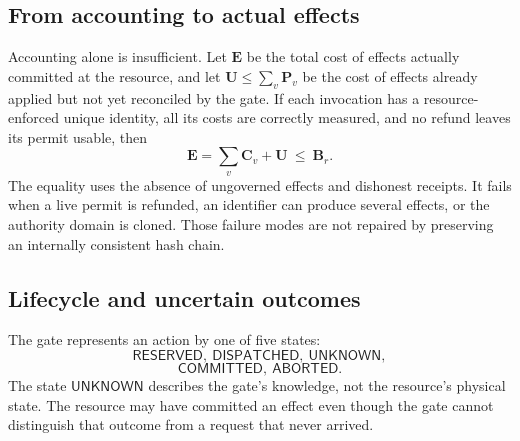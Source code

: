 \documentclass[10pt,journal,a4paper]{IEEEtran}
\newcommand{\state}[1]{\ensuremath{\mathsf{#1}}}
\newcommand{\Budget}{\mathbf{B}}
\newcommand{\Pending}{\mathbf{P}}
\newcommand{\Spent}{\mathbf{C}}
\begin{document}
\subsection{From accounting to actual effects}
Accounting alone is insufficient. Let $\mathbf E$ be the total cost of effects actually committed at the resource, and let $\mathbf U\leq\sum_v\Pending_v$ be the cost of effects already applied but not yet reconciled by the gate. If each invocation has a resource-enforced unique identity, all its costs are correctly measured, and no refund leaves its permit usable, then
\begin{equation}
\mathbf E=\sum_v\Spent_v+\mathbf U
\ \leq\ \Budget_r .
\label{eq:effects}
\end{equation}
The equality uses the absence of ungoverned effects and dishonest receipts. It fails when a live permit is refunded, an identifier can produce several effects, or the authority domain is cloned. Those failure modes are not repaired by preserving an internally consistent hash chain.

\subsection{Lifecycle and uncertain outcomes}
The gate represents an action by one of five states:
\begin{equation*}
\state{RESERVED},\ \state{DISPATCHED},\ \state{UNKNOWN},
\end{equation*}
\begin{equation*}
\state{COMMITTED},\ \state{ABORTED}.
\end{equation*}
The state \state{UNKNOWN} describes the gate's knowledge, not the resource's physical state. The resource may have committed an effect even though the gate cannot distinguish that outcome from a request that never arrived.
\end{document}
